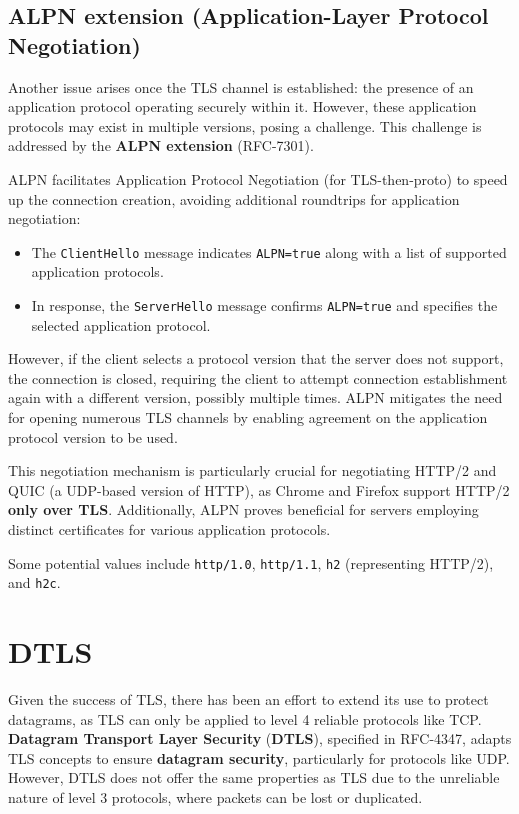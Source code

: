 \subsection{ALPN extension (Application-Layer Protocol Negotiation)}
Another issue arises once the TLS channel is established: the presence of an application protocol operating securely within it. However, these application protocols may exist in multiple versions, posing a challenge. This challenge is addressed by the \textbf{ALPN extension} (RFC-7301).

ALPN facilitates Application Protocol Negotiation (for TLS-then-proto) to speed up the connection creation, avoiding additional roundtrips for application negotiation:
\begin{itemize}
    \item The \texttt{ClientHello} message indicates \texttt{ALPN=true} along with a list of supported application protocols.
    \item In response, the \texttt{ServerHello} message confirms \texttt{ALPN=true} and specifies the selected application protocol.
\end{itemize}

However, if the client selects a protocol version that the server does not support, the connection is closed, requiring the client to attempt connection establishment again with a different version, possibly multiple times. ALPN mitigates the need for opening numerous TLS channels by enabling agreement on the application protocol version to be used.

This negotiation mechanism is particularly crucial for negotiating HTTP/2 and QUIC (a UDP-based version of HTTP), as Chrome and Firefox support HTTP/2 \textbf{only over TLS}. Additionally, ALPN proves beneficial for servers employing distinct certificates for various application protocols.

Some potential values include \texttt{http/1.0}, \texttt{http/1.1}, \texttt{h2} (representing HTTP/2), and \texttt{h2c}.


\section{DTLS}

Given the success of TLS, there has been an effort to extend its use to protect datagrams, as TLS can only be applied to level 4 reliable protocols like TCP. \textbf{Datagram Transport Layer Security} (\textbf{DTLS}), specified in RFC-4347, adapts TLS concepts to ensure \textbf{datagram security}, particularly for protocols like UDP. However, DTLS does not offer the same properties as TLS due to the unreliable nature of level 3 protocols, where packets can be lost or duplicated.

